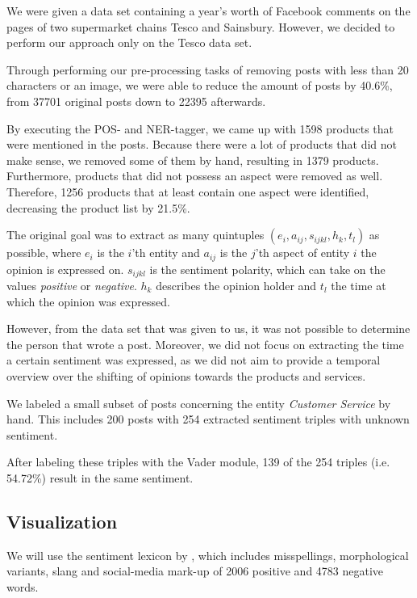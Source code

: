 \documentclass[10pt,a4paper]{article}
\begin{document}
	We were given a data set containing a year's worth of Facebook comments on the pages of two supermarket chains Tesco and Sainsbury. However, we decided to perform our approach only on the Tesco data set.
	
	Through performing our pre-processing tasks of removing posts with less than 20 characters or an image, we were able to reduce the amount of posts by 40.6\%, from 37701 original posts down to 22395 afterwards.

	By executing the POS- and NER-tagger, we came up with 1598 products that were mentioned in the posts. Because there were a lot of products that did not make sense, we removed some of them by hand, resulting in 1379 products. Furthermore, products that did not possess an aspect were removed as well. Therefore, 1256 products that at least contain one aspect were identified, decreasing the product list by 21.5\%. 

	The original goal was to extract as many quintuples $(e_i, a_{ij}, s_{ijkl}, h_k, t_l)$ as possible, where $e_i$ is the $i$'th entity and $a_{ij}$ is the $j$'th aspect of entity $i$ the opinion is expressed on. $s_{ijkl}$ is the sentiment polarity, which can take on the values \textit{positive} or \textit{negative}. $h_k$ describes the opinion holder and $t_l$ the time at which the opinion was expressed.

	However, from the data set that was given to us, it was not possible to determine the person that wrote a post. Moreover, we did not focus on extracting the time a certain sentiment was expressed, as we did not aim to provide a temporal overview over the shifting of opinions towards the products and services.
	
	

	We labeled a small subset of posts concerning the entity \textit{Customer Service} by hand. This includes 200 posts with 254 extracted sentiment triples with unknown sentiment.

	After labeling these triples with the Vader module, 139 of the 254 triples (i.e. 54.72\%) result in the same sentiment.

		\subsection{Visualization}
		We will use the sentiment lexicon by \cite{Hu:2004:MSC:1014052.1014073}, which includes misspellings, morphological variants, slang and social-media mark-up of 2006 positive and 4783 negative words.
\end{document}
